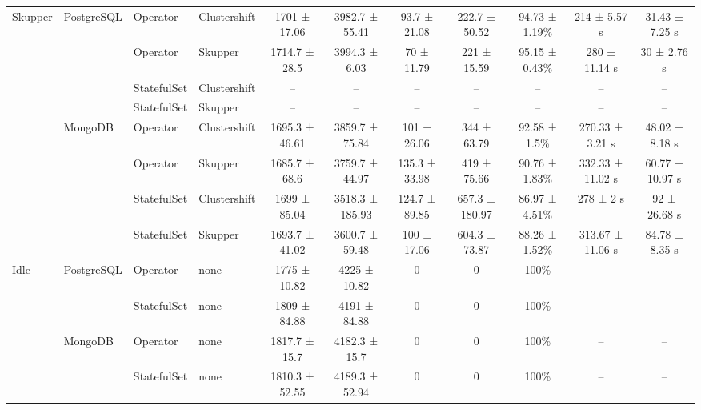 \begin{table}[tb]
{\begin{tabular}{@{}lll l cccc ccc@{}}
      \multirow{8}{*}{Skupper}
        & \multirow{4}{*}{PostgreSQL}
          & Operator    & Clustershift & 1701 ± 17.06 & 3982.7 ± 55.41 & 93.7 ± 21.08 & 222.7 ± 50.52 & 94.73 ± 1.19\% & 214 ± 5.57 s & 31.43 ± 7.25 s \\
              &                                             & Operator    & Skupper & 1714.7 ± 28.5 & 3994.3 ± 6.03 & 70 ± 11.79 & 221 ± 15.59 & 95.15 ± 0.43\% & 280 ± 11.14 s & 30 ± 2.76 s \\
              &                                             & StatefulSet    & Clustershift & -- & -- & -- & -- & -- & -- & -- \\
              &                                             & StatefulSet    & Skupper & -- & -- & -- & -- & -- & -- & -- \\
        \cmidrule(lr){2-11}
              & \multirow{4}{*}{MongoDB}
          & Operator    & Clustershift & 1695.3 ± 46.61 & 3859.7 ± 75.84 & 101 ± 26.06 & 344 ± 63.79 & 92.58 ± 1.5\% & 270.33 ± 3.21 s & 48.02 ± 8.18 s \\
              &                                             & Operator    & Skupper & 1685.7 ± 68.6 & 3759.7 ± 44.97 & 135.3 ± 33.98 & 419 ± 75.66 & 90.76 ± 1.83\% & 332.33 ± 11.02 s & 60.77 ± 10.97 s \\
              &                                             & StatefulSet    & Clustershift & 1699 ± 85.04 & 3518.3 ± 185.93 & 124.7 ± 89.85 & 657.3 ± 180.97 & 86.97 ± 4.51\% & 278 ± 2 s & 92 ± 26.68 s \\
              &                                             & StatefulSet    & Skupper & 1693.7 ± 41.02 & 3600.7 ± 59.48 & 100 ± 17.06 & 604.3 ± 73.87 & 88.26 ± 1.52\% & 313.67 ± 11.06 s & 84.78 ± 8.35 s \\
      \midrule

      \multirow{4}{*}{Idle}
        & \multirow{2}{*}{PostgreSQL}
          & Operator    & none & 1775 ± 10.82 & 4225 ± 10.82 & 0 & 0 & 100\% & -- & -- \\
              &                                             & StatefulSet    & none & 1809 ± 84.88 & 4191 ± 84.88 & 0 & 0 & 100\% & -- & -- \\
        \cmidrule(lr){2-11}
              & \multirow{2}{*}{MongoDB}
          & Operator    & none & 1817.7 ± 15.7 & 4182.3 ± 15.7 & 0 & 0 & 100\% & -- & -- \\
              &                                             & StatefulSet    & none & 1810.3 ± 52.55 & 4189.3 ± 52.94 & 0 & 0 & 100\% & -- & -- \\
      \bottomrule
    \end{tabular}
  }
\end{table}
